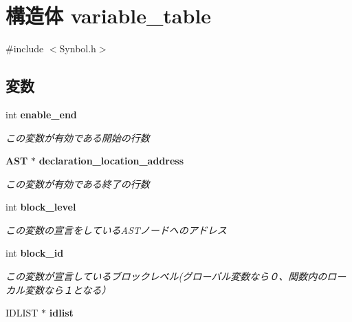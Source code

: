 \section{構造体 variable\_\-table}
\label{structvariable__table}


{\ttfamily \#include $<$Synbol.h$>$}

\subsection*{変数}
\begin{DoxyCompactItemize}
\item 
int {\bf enable\_\-end}\label{structvariable__table_a69b24ee97fe37831cbfe54edf6c5a9c0}

\begin{DoxyCompactList}\small\item\em この変数が有効である開始の行数 \item\end{DoxyCompactList}\item 
{\bf AST} $\ast$ {\bf declaration\_\-location\_\-address}\label{structvariable__table_ad4eca9a1daf1ccf260a672768a054d73}

\begin{DoxyCompactList}\small\item\em この変数が有効である終了の行数 \item\end{DoxyCompactList}\item 
int {\bf block\_\-level}\label{structvariable__table_a7dfd4036a14e108dda08ce0bd83e7fe1}

\begin{DoxyCompactList}\small\item\em この変数の宣言をしているASTノードへのアドレス \item\end{DoxyCompactList}\item 
int {\bf block\_\-id}\label{structvariable__table_a689fe54448fbbc46aaebb56203005cc4}

\begin{DoxyCompactList}\small\item\em この変数が宣言しているブロックレベル(グローバル変数なら０、関数内のローカル変数なら１となる） \item\end{DoxyCompactList}\item 
IDLIST $\ast$ {\bf idlist}\label{structvariable__table_ab7fbad4dd717512360b7f947a277b10b}


\end{DoxyCompactItemize}
